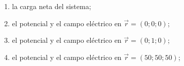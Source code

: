 \documentclass[a4paper,12pt]{article}
\begin{document}
\begin{enumerate}
\begin{enumerate}
\item la carga neta del sistema;
\item el potencial y el campo eléctrico en $\vec{r}=(0;0;0)$;
\item el potencial y el campo eléctrico en $\vec{r}=(0;1;0)$;
\item el potencial y el campo eléctrico en $\vec{r}=(50;50;50)$;
\end{enumerate}

\end{enumerate}
\end{document}
